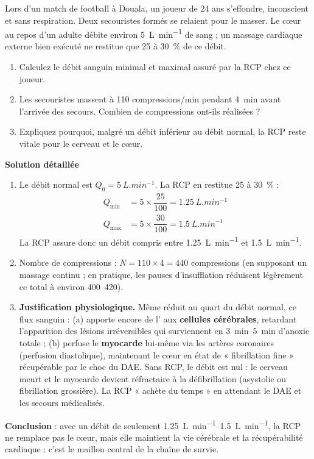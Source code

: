 \documentclass[11pt]{article}
\begin{document}
\begin{exoresolu}
Lors d'un match de football à Douala, un joueur de 24 ans s'effondre, inconscient et sans respiration. Deux secouristes formés se relaient pour le masser. Le cœur au repos d'un adulte débite environ \SI{5}{L.min^{-1}} de sang ; un massage cardiaque externe bien exécuté ne restitue que 25 à \SI{30}{\%} de ce débit.
\begin{enumerate}
\item Calculez le débit sanguin minimal et maximal assuré par la RCP chez ce joueur.
\item Les secouristes massent à 110 compressions/min pendant \SI{4}{min} avant l'arrivée des secours. Combien de compressions ont-ils réalisées ?
\item Expliquez pourquoi, malgré un débit inférieur au débit normal, la RCP reste vitale pour le cerveau et le cœur.
\end{enumerate}
\tcblower
\textbf{Solution détaillée}
\begin{enumerate}
\item Le débit normal est $Q_0 = \SI{5}{L.min^{-1}}$. La RCP en restitue 25 à \SI{30}{\%} :
\begin{align*}
Q_{\min} &= 5 \times \dfrac{25}{100} = \SI{1,25}{L.min^{-1}}\\
Q_{\max} &= 5 \times \dfrac{30}{100} = \SI{1,5}{L.min^{-1}}
\end{align*}
La RCP assure donc un débit compris entre \SI{1,25}{L.min^{-1}} et \SI{1,5}{L.min^{-1}}.
\item Nombre de compressions : $N = 110 \times 4 = 440$ compressions (en supposant un massage continu ; en pratique, les pauses d'insufflation réduisent légèrement ce total à environ 400--420).
\item \textbf{Justification physiologique.} Même réduit au quart du débit normal, ce flux sanguin : (a) apporte encore de l' aux \textbf{cellules cérébrales}, retardant l'apparition des lésions irréversibles qui surviennent en \SIrange{3}{5}{min} d'anoxie totale ; (b) perfuse le \textbf{myocarde} lui-même via les artères coronaires (perfusion diastolique), maintenant le cœur en état de « fibrillation fine » récupérable par le choc du DAE. Sans RCP, le débit est nul : le cerveau meurt et le myocarde devient réfractaire à la défibrillation (asystolie ou fibrillation grossière). La RCP « achète du temps » en attendant le DAE et les secours médicalisés.
\end{enumerate}
\textbf{Conclusion} : avec un débit de seulement \SIrange{1,25}{1,5}{L.min^{-1}}, la RCP ne remplace pas le cœur, mais elle maintient la vie cérébrale et la récupérabilité cardiaque : c'est le maillon central de la chaîne de survie.
\end{exoresolu}
\end{document}
